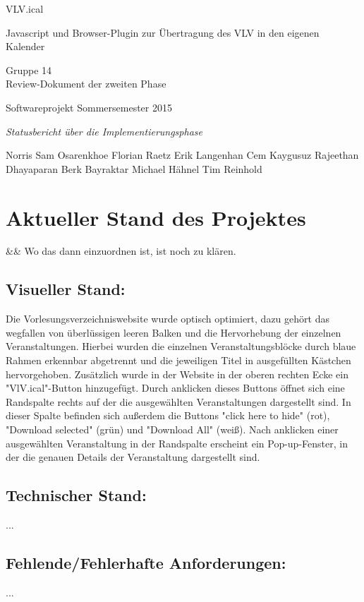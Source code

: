 \documentclass[11pt]{scrreprt}
\begin{document}
\begin{center}
\Huge
VLV.ical

\medskip
\large
Javascript und Browser-Plugin zur \"Ubertragung des VLV in den eigenen Kalender

\vskip 1in
\Large
Gruppe 14 \\
Review-Dokument der zweiten Phase

\large
\vskip 2in
Softwareprojekt Sommersemester 2015

\medskip
\textit{
Statusbericht über die Implementierungsphase
}
\vskip 3in

\normalsize
\textup{ 
Norris Sam Osarenkhoe \qquad
Florian Raetz \qquad
}
\textup{ 
Erik Langenhan \qquad
Cem Kaygusuz \qquad
}
\textup{ 
Rajeethan Dhayaparan \qquad
Berk Bayraktar \qquad
}
\textup{ 
Michael H\"ahnel \qquad
Tim Reinhold
}
\end{center}
\newpage

\chapter{Aktueller Stand des Projektes}
&& Wo das dann einzuordnen ist, ist noch zu klären.
\section{Visueller Stand:}
\normalsize \normalfont \textnormal
Die Vorlesungsverzeichniswebsite wurde optisch optimiert, dazu gehört das wegfallen von überlüssigen leeren Balken und die Hervorhebung der einzelnen Veranstaltungen. Hierbei wurden die einzelnen Veranstaltungsblöcke durch blaue Rahmen erkennbar abgetrennt und die jeweiligen Titel in ausgefüllten Kästchen hervorgehoben. Zusätzlich wurde in der Website in der oberen rechten Ecke ein "VlV.ical"-Button hinzugefügt. Durch anklicken dieses Buttons öffnet sich eine Randspalte rechts auf der die ausgewählten Veranstaltungen dargestellt sind. In dieser Spalte befinden sich außerdem die Buttons "click here to hide" (rot), "Download selected" (grün) und "Download All" (weiß). Nach anklicken einer ausgewählten Veranstaltung in der Randspalte erscheint ein Pop-up-Fenster, in der die genauen Details der Veranstaltung dargestellt sind.

\section{Technischer Stand:}
\normalsize \normalfont \textnormal
...

\section{Fehlende/Fehlerhafte Anforderungen:}
\normalsize \normalfont \textnormal
...
\end{document}
